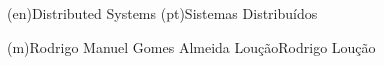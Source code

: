 %
%
%
%



%
%
%
%
\ntspecialization(en){Distributed Systems}         %
\ntspecialization(pt){Sistemas Distribuídos} %



%
%
\ntauthorname(m){Rodrigo Manuel Gomes Almeida Loução}{Rodrigo Loução}



%


%
%



